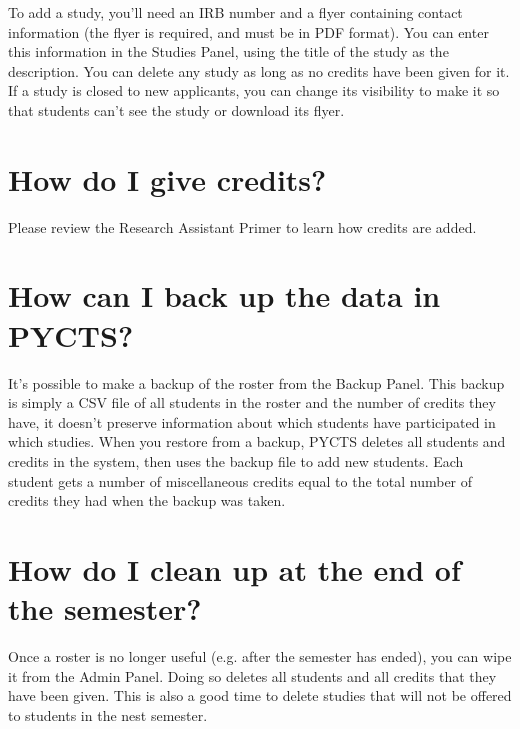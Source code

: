\documentclass[letterpaper]{article}
\begin{document}
To add a study, you'll need an IRB number and a flyer containing contact information (the flyer is required, and must be in PDF format). You can enter this information in the Studies Panel, using the title of the study as the description. You can delete any study as long as no credits have been given for it. If a study is closed to new applicants, you can change its visibility to make it so that students can't see the study or download its flyer.

\section{How do I give credits?}
Please review the Research Assistant Primer to learn how credits are added.

\section{How can I back up the data in PYCTS?}
It's possible to make a backup of the roster from the Backup Panel. This backup is simply a CSV file of all students in the roster and the number of credits they have, it doesn't preserve information about which students have participated in which studies. When you restore from a backup, PYCTS deletes all students and credits in the system, then uses the backup file to add new students. Each student gets a number of miscellaneous credits equal to the total number of credits they had when the backup was taken.

\section{How do I clean up at the end of the semester?}
Once a roster is no longer useful (e.g. after the semester has ended), you can wipe it from the Admin Panel. Doing so deletes all students and all credits that they have been given. This is also a good time to delete studies that will not be offered to students in the nest semester.
\end{document}
